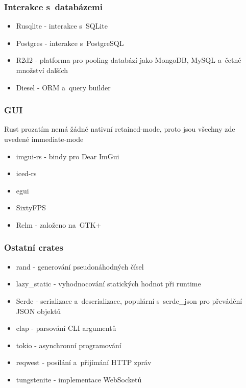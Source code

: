 \documentclass[a4paper, 12pt]{article} %
\begin{document}
        \subsubsection*{Interakce s~databázemi}
            \begin{itemize} 
                \item Rusqlite - interakce s~SQLite
                \item Postgres - interakce s~PostgreSQL
                \item R2d2 - platforma pro pooling databází jako MongoDB, MySQL a~četné množství dalších
                \item Diesel - ORM a~query builder
            \end{itemize}


        \subsubsection*{GUI}
            Rust prozatím nemá žádné nativní retained-mode, proto jsou všechny zde uvedené immediate-mode
            \begin{itemize} 
                \item imgui-rs - bindy pro Dear ImGui
                \item iced-rs
                \item egui
                \item SixtyFPS
                \item Relm - založeno na~GTK+
            \end{itemize}


        \subsubsection*{Ostatní crates}
            \begin{itemize}
                \item rand - generování pseudonáhodných čísel
                \item lazy\_static - vyhodnocování statických hodnot při runtime
                \item Serde - serializace a~deserializace, populární s~serde\_json pro převádění JSON objektů
                \item clap - parsování CLI argumentů
                \item tokio - asynchronní programování
                \item reqwest - posílání a~přijímání HTTP zpráv
                \item tungstenite - implementace WebSocketů
            \end{itemize}
\end{document}
